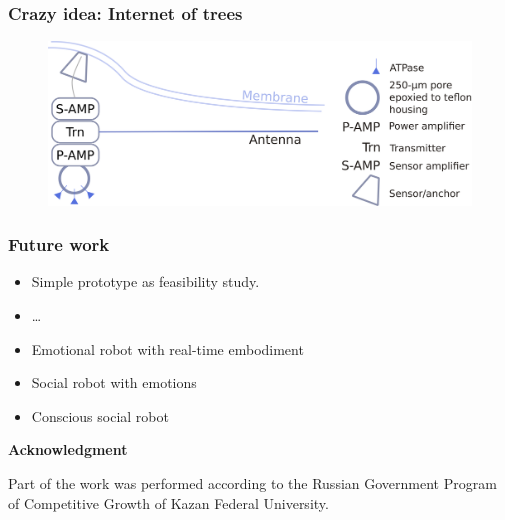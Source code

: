 \documentclass[12pt, aspectratio=169]{beamer}
\begin{document}
\begin{frame}
\frametitle{Crazy idea: Internet of trees}
\begin{figure}
\includegraphics[width=0.8\linewidth]{cellCircuit_transmitter_mould}
\end{figure}
\end{frame}



\begin{frame}
  \frametitle{Future work}
  
\begin{itemize}
  \item Simple prototype as feasibility study.
  \item \ldots\
  \item Emotional robot with real-time embodiment
  \item Social robot with emotions
  \item Conscious social robot
\end{itemize}

\textbf{Acknowledgment}

Part of the work was performed according to the Russian Government Program of Competitive Growth of Kazan Federal University.

\end{frame}



\end{document}
